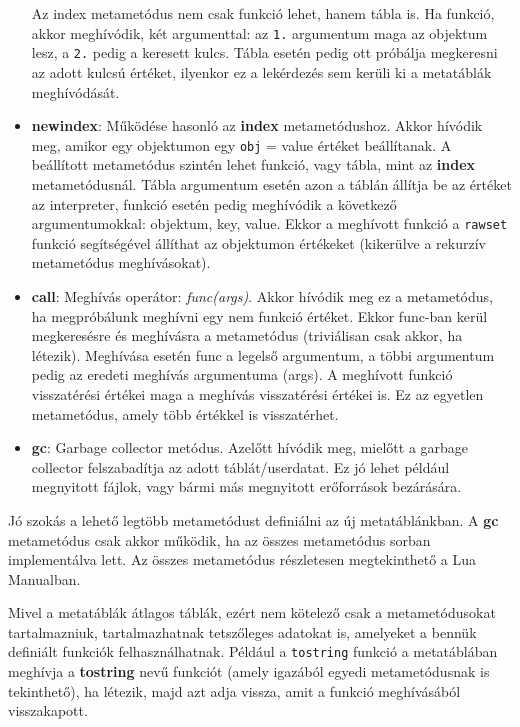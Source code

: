\begin{itemize}
\begin{itemize}
		\end{itemize} Az index metametódus nem csak funkció lehet, hanem tábla is. Ha funkció, akkor meghívódik, két argumenttal: az \texttt{1.} argumentum maga az objektum lesz, a \texttt{2.} pedig a keresett kulcs. Tábla esetén pedig ott próbálja megkeresni az adott kulcsú értéket, ilyenkor ez a lekérdezés sem kerüli ki a metatáblák meghívódását.
	\item \detokenize{__}\textbf{newindex}: Működése hasonló az \detokenize{__}\textbf{index} metametódushoz. Akkor hívódik meg, amikor egy objektumon egy \texttt{obj}\detokenize{[key]} = value értéket beállítanak. A beállított metametódus szintén lehet funkció, vagy tábla, mint az \detokenize{__}\textbf{index} metametódusnál. Tábla argumentum esetén azon a táblán állítja be az értéket az interpreter, funkció esetén pedig meghívódik a következő argumentumokkal: objektum, key, value. Ekkor a meghívott funkció a \texttt{rawset} funkció segítségével állíthat az objektumon értékeket (kikerülve a rekurzív metametódus meghívásokat).
	\item \detokenize{__}\textbf{call}: Meghívás operátor: \emph{func(args)}. Akkor hívódik meg ez a metametódus, ha megpróbálunk meghívni egy nem funkció értéket. Ekkor func-ban kerül megkeresésre és meghívásra a metametódus (triviálisan csak akkor, ha létezik). Meghívása esetén func a legelső argumentum, a többi argumentum pedig az eredeti meghívás argumentuma (args). A meghívott funkció visszatérési értékei maga a meghívás visszatérési értékei is. Ez az egyetlen metametódus, amely több értékkel is visszatérhet.
	\item \detokenize{__}\textbf{gc}: Garbage collector metódus. Azelőtt hívódik meg, mielőtt a garbage collector felszabadítja az adott táblát/userdatat. Ez jó lehet például megnyitott fájlok, vagy bármi más megnyitott erőforrások bezárására.
\end{itemize}

Jó szokás a lehető legtöbb metametódust definiálni az új metatáblánkban. A \detokenize{__}\textbf{gc} metametódus csak akkor működik, ha az összes metametódus sorban implementálva lett. Az összes metametódus részletesen megtekinthető a Lua Manualban.

Mivel a metatáblák átlagos táblák, ezért nem kötelező csak a metametódusokat tartalmazniuk, tartalmazhatnak tetszőleges adatokat is, amelyeket a bennük definiált funkciók felhasználhatnak. Például a \texttt{tostring} funkció a metatáblában meghívja a \detokenize{__}\textbf{tostring} nevű funkciót (amely igazából egyedi metametódusnak is tekinthető), ha létezik, majd azt adja vissza, amit a funkció meghívásából visszakapott. \cite{metatable1}

